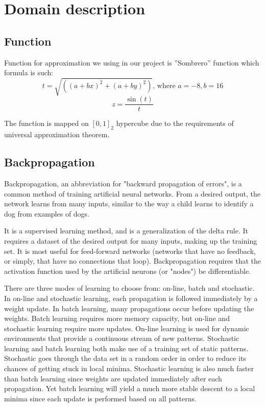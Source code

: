 \documentclass[a4paper,12pt]{article}
\begin{document}
\section{Domain description}
\subsection{Function}
Function for approximation we using in our project is ''Sombrero'' function which formula is such:
\begin{equation}
 t = \sqrt{((a+bx)^2+(a+by)^2)} \text{, where } a = -8, b = 16
 \end{equation}
 \begin{equation}
 z = \frac
 {\sin(t)}
 {t}
\end{equation}

The function is mapped on $[0,1]_2$ hypercube due to the requirements of universal approximation theorem.

\subsection{Backpropagation}

Backpropagation, an abbreviation for "backward propagation of errors", is a common method of training artificial neural networks. From a desired output, the network learns from many inputs, similar to the way a child learns to identify a dog from examples of dogs.

It is a supervised learning method, and is a generalization of the delta rule. It requires a dataset of the desired output for many inputs, making up the training set. It is most useful for feed-forward networks (networks that have no feedback, or simply, that have no connections that loop). Backpropagation requires that the activation function used by the artificial neurons (or "nodes") be differentiable.

There are three modes of learning to choose from: on-line, batch and stochastic. In on-line and stochastic learning, each propagation is followed immediately by a weight update. In batch learning, many propagations occur before updating the weights. Batch learning requires more memory capacity, but on-line and stochastic learning require more updates. On-line learning is used for dynamic environments that provide a continuous stream of new patterns. Stochastic learning and batch learning both make use of a training set of static patterns. Stochastic goes through the data set in a random order in order to reduce its chances of getting stuck in local minima. Stochastic learning is also much faster than batch learning since weights are updated immediately after each propagation. Yet batch learning will yield a much more stable descent to a local minima since each update is performed based on all patterns.
\end{document}
